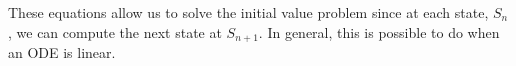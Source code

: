 \documentclass[a4paper,11pt]{report}
\begin{document}
\begin{enumerate}
\begin{itemize}
    \end{itemize}
       
    These equations allow us to solve the initial value problem since at 
    each state, $S_{n}$, we can compute the next state at $S_{n+1}$. In 
    general, this is possible to do when an ODE is linear.

\end{enumerate}
\end{document}
